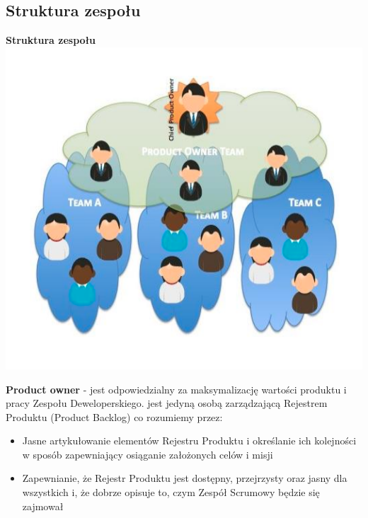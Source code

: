 \documentclass[12pt]{article}
\begin{document}
    \subsection{Struktura zespołu}
    
    \begin{definition}
    \textbf{Struktura zespołu} \\
    \includegraphics[width=\linewidth]{scrum_teams.png}
    \end{definition}
    
    \begin{definition}
    \textbf{Product owner} - jest odpowiedzialny za maksymalizację wartości produktu i pracy Zespołu Deweloperskiego. jest jedyną osobą zarządzającą Rejestrem Produktu (Product Backlog) co rozumiemy przez:
    \begin{itemize}
        \item Jasne artykułowanie elementów Rejestru Produktu i określanie ich kolejności w sposób zapewniający osiąganie założonych celów i misji
        \item Zapewnianie, że Rejestr Produktu jest dostępny, przejrzysty oraz jasny dla wszystkich i, że dobrze opisuje to, czym Zespół Scrumowy będzie się zajmował
    \end{itemize}
    \end{definition}
    
\end{document}
